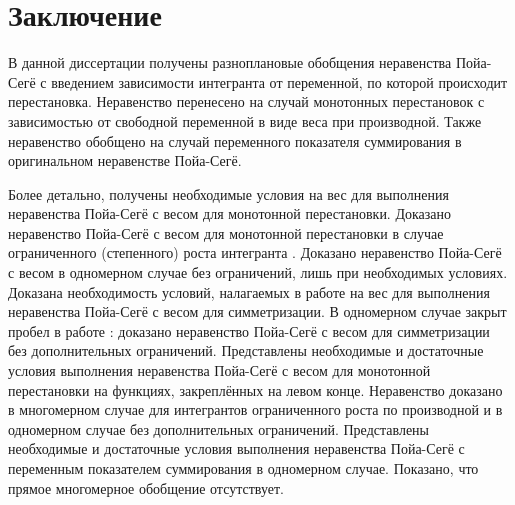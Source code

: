 \chapter*{Заключение}						%


%
%


В данной диссертации получены разноплановые обобщения неравенства Пойа-Сегё
с введением зависимости интегранта от переменной, по которой происходит перестановка.
Неравенство перенесено на случай монотонных перестановок с зависимостью от свободной переменной в виде веса при производной.
Также неравенство обобщено на случай переменного показателя суммирования в оригинальном неравенстве Пойа-Сегё.

Более детально,
получены необходимые условия на вес для выполнения неравенства Пойа-Сегё с весом для монотонной перестановки.
Доказано неравенство Пойа-Сегё с весом для монотонной перестановки в случае ограниченного (степенного) роста интегранта .
Доказано неравенство Пойа-Сегё с весом в одномерном случае без ограничений, лишь при необходимых условиях.
Доказана необходимость условий, налагаемых в работе \cite{Brock} на вес для выполнения неравенства Пойа-Сегё с весом для симметризации.
В одномерном случае закрыт пробел в работе \cite{Brock}:
доказано неравенство Пойа-Сегё с весом для симметризации без дополнительных ограничений.
Представлены необходимые и достаточные условия выполнения неравенства Пойа-Сегё с весом для монотонной перестановки
на функциях, закреплённых на левом конце.
Неравенство доказано в многомерном случае для интегрантов ограниченного роста по производной
и в одномерном случае без дополнительных ограничений.
Представлены необходимые и достаточные условия выполнения неравенства Пойа-Сегё с переменным показателем
суммирования в одномерном случае.
Показано, что прямое многомерное обобщение отсутствует.
